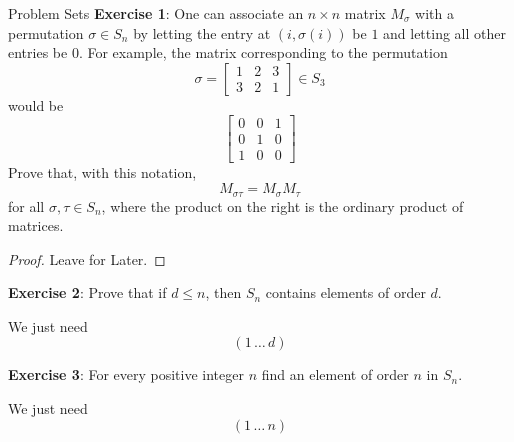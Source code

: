 \documentclass{report}
\begin{document}
\begin{exercises}{Problem Sets}
    \textbf{Exercise 1}: One can associate an $n \times n$ matrix $M_{\sigma}$ with a permutation $\sigma \in S_{n}$ by letting the entry at $(i, \sigma(i))$ be $1$ and letting all other entries be $0$. For example, the matrix corresponding to the permutation
        \begin{equation*}
            \sigma = 
            \begin{bmatrix}
                1 & 2 & 3 \\
                3 & 2 & 1   
            \end{bmatrix} \in S_{3}
        \end{equation*}
    would be 
        \begin{equation*}
            \begin{bmatrix}
                0 & 0 & 1 \\
                0 & 1 & 0 \\
                1 & 0 & 0   
            \end{bmatrix}
        \end{equation*}
    Prove that, with this notation,
        \begin{equation*}
            M_{\sigma\tau} = M_{\sigma}M_{\tau}
        \end{equation*}
    for all $\sigma, \tau \in S_{n}$, where the product on the right is the ordinary product of matrices.
        \begin{proof}
            Leave for Later.
        \end{proof}

    \textbf{Exercise 2}: Prove that if $d \leq n$, then $S_{n}$ contains elements of order $d$.
        \begin{answer}
            We just need 
                \begin{equation*}
                    (1 \, \ldots \, d)
                \end{equation*}
        \end{answer}

    \textbf{Exercise 3}: For every positive integer $n$ find an element of order $n$ in $S_{n}$.
        \begin{answer}
            We just need
                \begin{equation*}
                    (1 \, \ldots \, n)
                \end{equation*}
        \end{answer}


\end{exercises}
\end{document}
